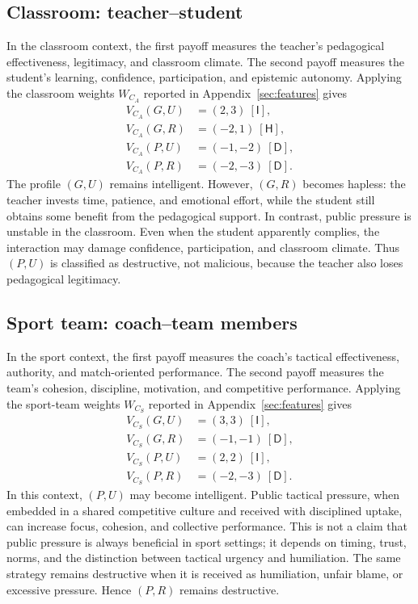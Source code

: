 \documentclass[a4paper,fleqn]{cas-dc}
\theoremstyle{remark}
\newcommand{\Iclass}{\mathsf{I}}
\newcommand{\Hclass}{\mathsf{H}}
\newcommand{\Dclass}{\mathsf{D}}
\begin{document}
\subsection{Classroom: teacher--student}

In the classroom context, the first payoff measures the teacher's pedagogical effectiveness, legitimacy, and classroom climate. The second payoff measures the student's learning, confidence, participation, and epistemic autonomy. Applying the classroom weights $W_{C_A}$ reported in Appendix~\ref{sec:features} gives
\[
\begin{aligned}
V_{C_A}(G,U)&=(2,3)\ [\Iclass],\\
V_{C_A}(G,R)&=(-2,1)\ [\Hclass],\\
V_{C_A}(P,U)&=(-1,-2)\ [\Dclass],\\
V_{C_A}(P,R)&=(-2,-3)\ [\Dclass].
\end{aligned}
\]
The profile $(G,U)$ remains intelligent. However, $(G,R)$ becomes hapless: the teacher invests time, patience, and emotional effort, while the student still obtains some benefit from the pedagogical support. In contrast, public pressure is unstable in the classroom. Even when the student apparently complies, the interaction may damage confidence, participation, and classroom climate. Thus $(P,U)$ is classified as destructive, not malicious, because the teacher also loses pedagogical legitimacy.

\subsection{Sport team: coach--team members}

In the sport context, the first payoff measures the coach's tactical effectiveness, authority, and match-oriented performance. The second payoff measures the team's cohesion, discipline, motivation, and competitive performance. Applying the sport-team weights $W_{C_S}$ reported in Appendix~\ref{sec:features} gives
\[
\begin{aligned}
V_{C_S}(G,U)&=(3,3)\ [\Iclass],\\
V_{C_S}(G,R)&=(-1,-1)\ [\Dclass],\\
V_{C_S}(P,U)&=(2,2)\ [\Iclass],\\
V_{C_S}(P,R)&=(-2,-3)\ [\Dclass].
\end{aligned}
\]
In this context, $(P,U)$ may become intelligent. Public tactical pressure, when embedded in a shared competitive culture and received with disciplined uptake, can increase focus, cohesion, and collective performance. This is not a claim that public pressure is always beneficial in sport settings; it depends on timing, trust, norms, and the distinction between tactical urgency and humiliation. The same strategy remains destructive when it is received as humiliation, unfair blame, or excessive pressure. Hence $(P,R)$ remains destructive.
\end{document}

